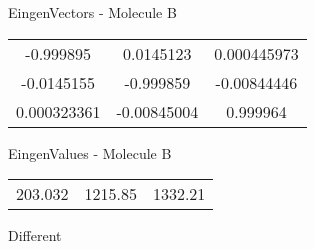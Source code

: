 \begin{multicols}{2}
\begin{center}
\vtab
 EingenVectors - Molecule B     \\
\vtab
\begin{tabular}{|c c c|}
-0.999895	 & 	0.0145123	 & 	0.000445973	 \\
-0.0145155	 & 	-0.999859	 & 	-0.00844446	 \\
0.000323361	 & 	-0.00845004	 & 	0.999964
\end{tabular}

\vtab
 EingenValues - Molecule B     \\
\vtab
\begin{tabular}{|c c c|}
203.032	 & 	1215.85	 & 	1332.21	 \\
\end{tabular}

\end{center}
\end{multicols}
\begin{center}
\vtab
\vtab
\textcolor{NavyBlue}{\Large Different}
\end{center}

 \newpage

